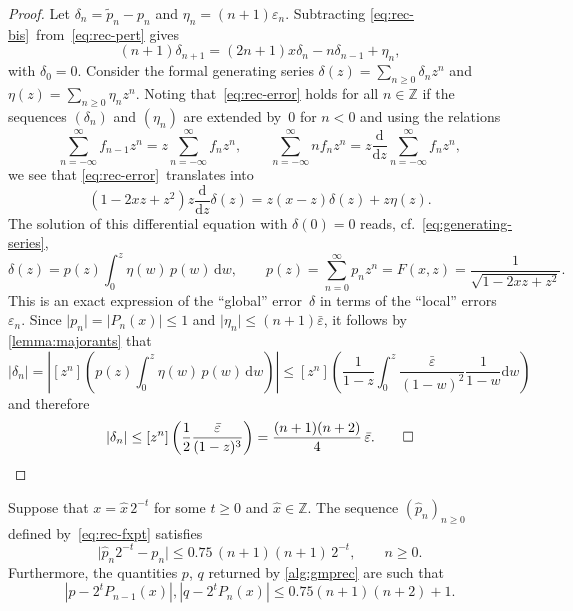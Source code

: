 \documentclass[nohypdvips,review]{siamart0216}
\newcommand{\abs}[1]{\mathopen| #1 \mathclose|}
\newcommand{\dw}{\mathrm d w}
\newcommand{\ddz}{\frac{\mathrm d}{\mathrm dz}}
\begin{document}
\begin{proof}
Let
$\delta_n = \tilde{p}_n - p_n$
and
$\eta_n = (n + 1) \varepsilon_n$.
Subtracting \cref{eq:rec-bis} from \cref{eq:rec-pert} gives
\begin{equation} \label{eq:rec-error}
  (n + 1) \delta_{n + 1}
  = (2 n + 1) x \delta_n - n \delta_{n - 1} + \eta_n,
\end{equation}
with $\delta_0 = 0$.
Consider the formal generating series
$\delta(z) = \sum_{n \geq 0} \delta_n z^n$
and
$\eta(z) = \sum_{n \geq 0} \eta_n z^n$.
Noting that \cref{eq:rec-error} holds for all $n \in \mathbb{Z}$ if
the sequences $(\delta_n)$ and $(\eta_n)$ are extended by~$0$ for
$n < 0$
and using the relations
\[
  \sum_{n=-\infty}^{\infty} f_{n - 1} z^n
  = z \sum_{n=-\infty}^{\infty} f_n z^n,
  \qquad
  \sum_{n=-\infty}^{\infty} n f_{n} z^n
  = z \ddz \sum_{n=-\infty}^{\infty} f_n z^n,
\]
we see that \cref{eq:rec-error} translates into
\[ (1 - 2 xz + z^2) z \ddz \delta (z)
   = z (x - z) \delta (z) + z \eta (z). \]
The solution of this differential equation with $\delta (0) = 0$ reads,
cf.~\cref{eq:generating-series},
\[ \delta(z) = p(z)  \int_0^z \eta(w) \, p(w) \, \dw,
   \qquad
   p(z) = \sum_{n=0}^{\infty} p_n z^n
        = F(x, z)
        = \frac{1}{\sqrt{1 - 2 xz + z^2}}. \]
This is an exact expression of the ``global'' error $\delta$ in terms
of the ``local'' errors~$\varepsilon_n$.
Since $\abs{p_n} = \abs{P_n(x)} \leq 1$
and $\abs{\eta_n} \leq (n+1) \bar \varepsilon$,
it follows by \cref{lemma:majorants} that
\[
  \abs{\delta_n}
  = \left| [z^n] \left( p(z)  \int_0^z \eta(w) \, p(w) \, \dw \right) \right|
  \leq [z^n] \left(
    \frac{1}{1-z}
    \int_0^z \frac{\bar \varepsilon}{(1 - w)^2} \frac{1}{1-w} \dw \right)
\]
and therefore
\[
  \abs{\delta_n}
  \leq [z^n] \left( \frac12 \frac{\bar \varepsilon}{(1-z)^3} \right)
  = \frac{(n+1)(n+2)}{4} \, \bar \varepsilon. \qed
\]
\end{proof}

\begin{corollary}
Suppose that $x = \hat x \, 2^{-t}$ for some $t \geq 0$ and
$\hat x \in \mathbb Z$.
The sequence $(\hat p_n)_{n \geq 0}$ defined by \cref{eq:rec-fxpt}
satisfies
\begin{equation} \label{eq:bound-fxprec}
  \abs{ \hat p_n 2^{-t} - p_n }
  \leq 0.75 \, (n+1) (n+1) \, 2^{-t},
  \qquad
  n \geq 0.
\end{equation}
Furthermore, the quantities $p$, $q$ returned by \cref{alg:gmprec}
are such that
\begin{equation} \label{eq:bound-gmprec}
  |p - 2^t P_{n-1}(x)|, |q - 2^t P_{n}(x)|
  \le 0.75 (n+1)(n+2) + 1.
\end{equation}
\end{corollary}
\end{document}
